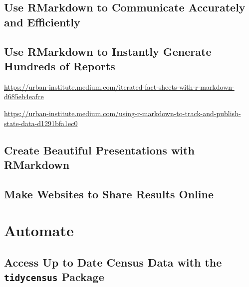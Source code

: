 \documentclass[
]{book}
\begin{document}
\hypertarget{use-rmarkdown-to-communicate-accurately-and-efficiently}{%
\chapter*{Use RMarkdown to Communicate Accurately and Efficiently}\label{use-rmarkdown-to-communicate-accurately-and-efficiently}}

\hypertarget{use-rmarkdown-to-instantly-generate-hundreds-of-reports}{%
\chapter*{Use RMarkdown to Instantly Generate Hundreds of Reports}\label{use-rmarkdown-to-instantly-generate-hundreds-of-reports}}

\url{https://urban-institute.medium.com/iterated-fact-sheets-with-r-markdown-d685eb4eafce}

\url{https://urban-institute.medium.com/using-r-markdown-to-track-and-publish-state-data-d1291bfa1ec0}

\hypertarget{create-beautiful-presentations-with-rmarkdown}{%
\chapter*{Create Beautiful Presentations with RMarkdown}\label{create-beautiful-presentations-with-rmarkdown}}

\hypertarget{make-websites-to-share-results-online}{%
\chapter*{Make Websites to Share Results Online}\label{make-websites-to-share-results-online}}

\hypertarget{part-automate}{%
\part*{Automate}\label{part-automate}}

\hypertarget{access-up-to-date-census-data-with-the-tidycensus-package}{%
\chapter*{\texorpdfstring{Access Up to Date Census Data with the \texttt{tidycensus} Package}{Access Up to Date Census Data with the tidycensus Package}}\label{access-up-to-date-census-data-with-the-tidycensus-package}}
\end{document}
